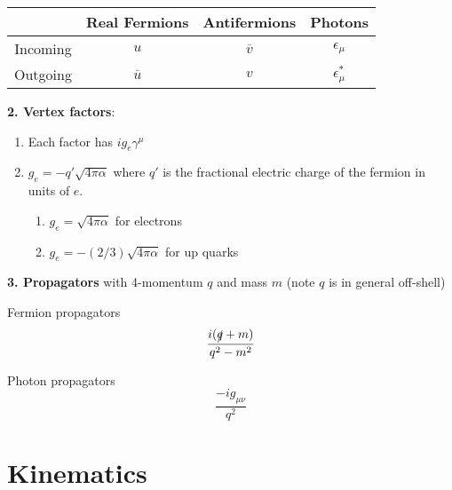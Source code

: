 \documentclass[12pt]{article}
\theoremstyle{definition}
\begin{document}
\begin{center}
    \begin{tabular}{cccc}
        & Real Fermions & Antifermions & Photons \\
        \hline
        Incoming & $u$ & $\overline{v}$ & $\epsilon_\mu$ \\
        Outgoing & $\overline{u}$ & $v$ & $\epsilon^*_\mu$ \\
    \end{tabular}
\end{center}

\textbf{2. Vertex factors}:
\begin{enumerate}
    \item Each factor has $i g_e \gamma^\mu$
    \item $g_e = - q' \sqrt{4 \pi \alpha}$ where $q'$ is the fractional electric charge of the fermion in units
        of $e$.
    \begin{enumerate}
        \item $g_e = \sqrt{4\pi\alpha} $ for electrons
        \item $g_e = -(2/3) \sqrt{4\pi\alpha}$ for up quarks
    \end{enumerate}
\end{enumerate}

\textbf{3. Propagators} with 4-momentum $q$ and mass $m$ (note $q$ is in general off-shell)

Fermion propagators
\begin{equation*}
    \frac{i(\slashed{q} + m)}{q^2 - m^2}
\end{equation*}

Photon propagators
\begin{equation*}
    \frac{-i g_{\mu\nu}}{q^2}
\end{equation*}


\section{Kinematics}
\end{document}
